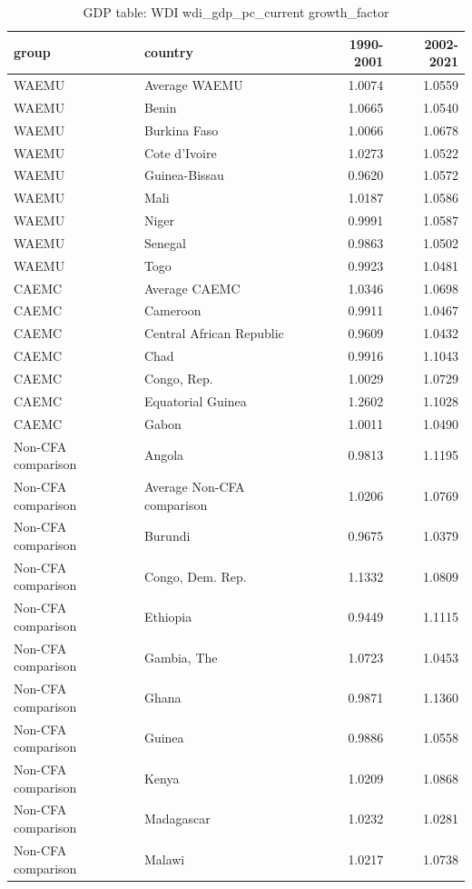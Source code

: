 \begin{table}

\caption{GDP table: WDI wdi_gdp_pc_current growth_factor}
\centering
\begin{tabular}[t]{llrr}
\toprule
group & country & 1990-2001 & 2002-2021\\
\midrule
WAEMU & Average WAEMU & 1.0074 & 1.0559\\
WAEMU & Benin & 1.0665 & 1.0540\\
WAEMU & Burkina Faso & 1.0066 & 1.0678\\
WAEMU & Cote d'Ivoire & 1.0273 & 1.0522\\
WAEMU & Guinea-Bissau & 0.9620 & 1.0572\\
\addlinespace
WAEMU & Mali & 1.0187 & 1.0586\\
WAEMU & Niger & 0.9991 & 1.0587\\
WAEMU & Senegal & 0.9863 & 1.0502\\
WAEMU & Togo & 0.9923 & 1.0481\\
CAEMC & Average CAEMC & 1.0346 & 1.0698\\
\addlinespace
CAEMC & Cameroon & 0.9911 & 1.0467\\
CAEMC & Central African Republic & 0.9609 & 1.0432\\
CAEMC & Chad & 0.9916 & 1.1043\\
CAEMC & Congo, Rep. & 1.0029 & 1.0729\\
CAEMC & Equatorial Guinea & 1.2602 & 1.1028\\
\addlinespace
CAEMC & Gabon & 1.0011 & 1.0490\\
Non-CFA comparison & Angola & 0.9813 & 1.1195\\
Non-CFA comparison & Average Non-CFA comparison & 1.0206 & 1.0769\\
Non-CFA comparison & Burundi & 0.9675 & 1.0379\\
Non-CFA comparison & Congo, Dem. Rep. & 1.1332 & 1.0809\\
\addlinespace
Non-CFA comparison & Ethiopia & 0.9449 & 1.1115\\
Non-CFA comparison & Gambia, The & 1.0723 & 1.0453\\
Non-CFA comparison & Ghana & 0.9871 & 1.1360\\
Non-CFA comparison & Guinea & 0.9886 & 1.0558\\
Non-CFA comparison & Kenya & 1.0209 & 1.0868\\
\addlinespace
Non-CFA comparison & Madagascar & 1.0232 & 1.0281\\
Non-CFA comparison & Malawi & 1.0217 & 1.0738\\

\end{tabular}
\end{table}
